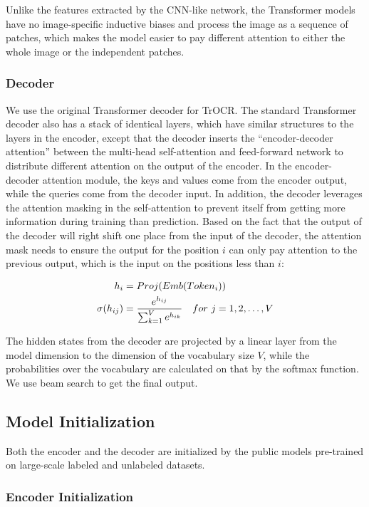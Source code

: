 \documentclass[letterpaper]{article} \usepackage{aaai23}  \usepackage{times}  \usepackage{helvet}  \usepackage{courier}  \usepackage[hyphens]{url}  \usepackage{graphicx} \urlstyle{rm} \def\UrlFont{\rm}  \usepackage{natbib}  \usepackage{caption} \frenchspacing  \setlength{\pdfpagewidth}{8.5in} \setlength{\pdfpageheight}{11in} \usepackage{algorithm}
\begin{document}
Unlike the features extracted by the CNN-like network, the Transformer models have no image-specific inductive biases and process the image as a sequence of patches, which makes the model easier to pay different attention to either the whole image or the independent patches.

\subsubsection{Decoder}
\label{sec:decoder}

We use the original Transformer decoder for TrOCR. The standard Transformer decoder also has a stack of identical layers, which have similar structures to the layers in the encoder, except that the decoder inserts the ``encoder-decoder attention'' between the multi-head self-attention and feed-forward network to distribute different attention on the output of the encoder. In the encoder-decoder attention module, the keys and values come from the encoder output, while the queries come from the decoder input. In addition, the decoder leverages the attention masking in the self-attention to prevent itself from getting more information during training than prediction. Based on the fact that the output of the decoder will right shift one place from the input of the decoder, the attention mask needs to ensure the output for the position $i$ can only pay attention to the previous output, which is the input on the positions less than $i$:


\begin{align}
    h_i &= Proj(Emb(Token_i))\notag \\
    \sigma(h_{ij}) &= \frac{e^{h_{ij}}}{\sum_{k=1}^V e^{h_{ik}}} \ \ \ for\ j=1,2,\dots,V \notag
\end{align}

The hidden states from the decoder are projected by a linear layer from the model dimension to the dimension of the vocabulary size $V$, while the probabilities over the vocabulary are calculated on that by the softmax function. We use beam search to get the final output.


\subsection{Model Initialization}
Both the encoder and the decoder are initialized by the public models pre-trained on large-scale labeled and unlabeled datasets.

\subsubsection{Encoder Initialization}
\end{document}
